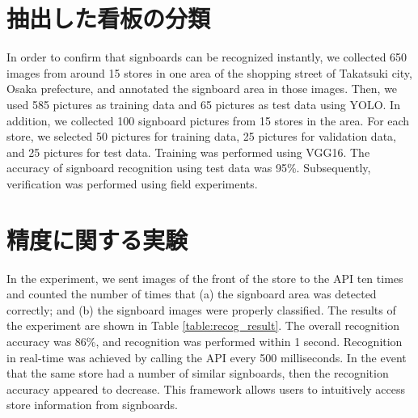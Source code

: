 \section{抽出した看板の分類}

  In order to confirm that signboards can be recognized instantly, %
  we collected 650 images from around 15 stores in one area of the shopping street of Takatsuki city, Osaka prefecture,
  and annotated the signboard area in those images.
  Then, we used 585 pictures as training data and 65 pictures as test data using YOLO.
  In addition, we collected 100 signboard pictures from 15 stores in the area.
  For each store, we selected 50 pictures for training data, 25 pictures for validation data,  and 25 pictures for test data. Training was performed using VGG16.
  The accuracy of signboard recognition using test data was 95\%.
  Subsequently, verification was performed using field experiments.

\section{精度に関する実験}
  In the experiment, we sent images of the front of the store to the API ten times and counted the number of times that (a) the signboard area was detected correctly; and (b) the signboard images were properly classified.
  The results of the experiment are shown in Table \ref{table:recog_result}.
  The overall recognition accuracy was 86\%, and recognition was performed within 1 second.
  Recognition in real-time was achieved by calling the API every 500 milliseconds.
  In the event that the same store had a number of similar signboards, then the recognition accuracy appeared to decrease.
  This framework allows users to intuitively access store information from signboards.

